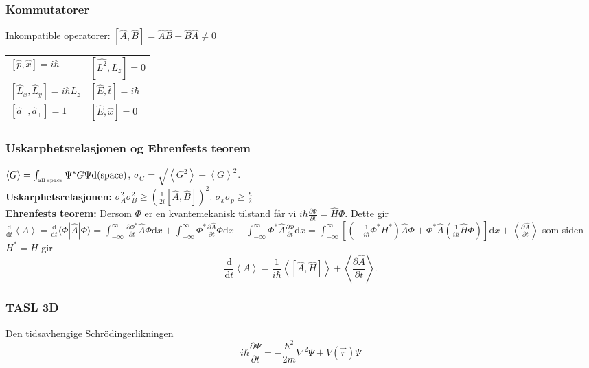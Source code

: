 \documentclass[a4paper, norsk, 8pt]{article}
\newcommand{\PAR}[2]{ \frac{\partial #1}{\partial #2}}
\newcommand{\expe}[1] { \left\langle#1\right\rangle }
\newcommand{\ket}[1] { |#1\rangle }
\newcommand{\bra}[1] { \langle #1 | }
\newcommand{\commutator}[2]{ \left[ #1 , #2\right] }
\begin{document}
\begin{multicols*}{3}
\subsubsection*{\scriptsize Kommutatorer}
Inkompatible operatorer: $\commutator{\hat{A}}{\hat{B}}=\hat{A}\hat{B}-\hat{B}\hat{A}\neq 0$\\
\begin{tabular}{|l|l|}
\hline
$\commutator{\hat{p}}{\hat{x}}=i\hbar$				& $\commutator{\hat{L^2}}{\hat{L}_z}=0$ 	\\
$\commutator{\hat{L}_x}{\hat{L}_y}=i\hbar L_z$		& $\commutator{\hat{E}}{\hat{t}}=i\hbar$ 	\\
$\commutator{\hat{a}_-}{\hat{a}_+}=1$				& $\commutator{\hat{E}}{\hat{x}}=0$   		\\ \hline
\end{tabular} 


\subsubsection*{\scriptsize Uskarphetsrelasjonen og Ehrenfests teorem} 
$\expe{G}=\int_{\mbox{\tiny all space}}\Psi^*G\Psi \mbox{d}(\mbox{space})$, $\sigma_G=\sqrt{\expe{G^2}-\expe{G}^2}$.\\
\textbf{Uskarphetsrelasjonen:} $\sigma_A^2 \sigma_B^2 \geq \left(\frac{1}{2i}\commutator{\hat{A}}{\hat{B}}\right)^2$.
$\sigma_x\sigma_p \geq \frac{\hbar}{2}$\\
\textbf{Ehrenfests teorem:} Dersom $\Phi$ er en kvantemekanisk tilstand får vi $i\hbar\PAR{\Phi}{t}=\hat{H}\Phi$. Dette gir
$\frac{\mbox{d}}{\mbox{d}t}\expe{A} =\frac{\mbox{d}}{\mbox{d}t} \bra{\Phi}\hat{A}\ket{\Phi} = \int_{-\infty}^{\infty} \PAR{\Phi^*}{t}\hat{A}\Phi\mbox{d}x + \int_{-\infty}^{\infty} \Phi^*\PAR{\hat{A}}{t}\Phi\mbox{d}x+\int_{-\infty}^{\infty} \Phi^*\hat{A}\PAR{\Phi}{t}\mbox{d}x = \int_{-\infty}^{\infty} \left[\left(-\frac{1}{i\hbar}\Phi^*H^*\right)\hat{A}\Phi+\Phi^*\hat{A}\left(\frac{1}{i\hbar}\hat{H}\Phi\right) \right]\mbox{d}x+\expe{\PAR{\hat{A}}{t}}$ som siden $H^*=H$ gir \[
\frac{\mbox{d}}{\mbox{d}t}\expe{A}=\frac{1}{i\hbar}\expe{\commutator{\hat{A}}{\hat{H}}}+\expe{\PAR{\hat{A}}{t}}.\]

\subsubsection*{\scriptsize TASL 3D}
Den tidsavhengige Schrödingerlikningen \[i\hbar \frac{\partial \Psi}{\partial t} = -\frac{\hbar^2}{2m}\nabla^2 \Psi+V(\vec{r})\Psi\]  


\end{multicols*}
\end{document}
